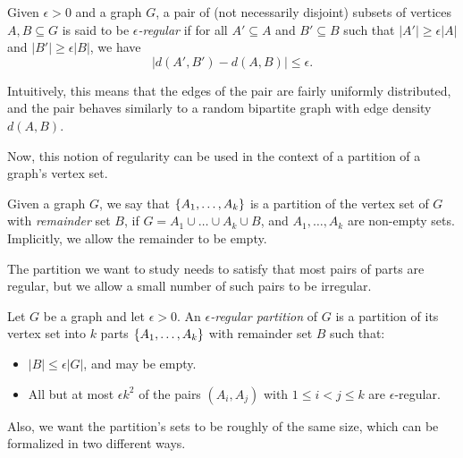         \begin{definition} \label{def:regularity}
            Given $\epsilon > 0$ and a graph $G$, a pair of (not necessarily disjoint) subsets of vertices $A, B \subseteq G$
            is said to be \emph{$\epsilon$-regular} if for all $A' \subseteq A$ and $B' \subseteq B$ such that
            $|A'| \geq \epsilon |A|$ and $|B'| \geq \epsilon |B|$, we have
            \[
                |d(A', B') - d(A, B)| \leq \epsilon.
            \]
        \end{definition}

        Intuitively, this means that the edges of the pair are fairly uniformly distributed, and the pair behaves
        similarly to a random bipartite graph with edge density $d(A, B)$.

        Now, this notion of regularity can be used in the context of a partition of a graph's vertex set.

        \begin{definition}
            Given a graph $G$, we say that $\{ A_1, \ldots, A_k \}$ is a partition of the vertex set of $G$ with
            \emph{remainder} set $B$, if $G = A_1 \cup \dots \cup A_k \cup B$, and $A_1, \dots, A_k$ are non-empty sets.
            Implicitly, we allow the remainder to be empty.
        \end{definition}

        The partition we want to study needs to satisfy that most pairs of parts are regular,
        but we allow a small number of such pairs to be irregular.

        \begin{definition} \label{def:regular_partition}
            Let $G$ be a graph and let $\epsilon > 0$.
            An \emph{$\epsilon$-regular partition} of $G$ is a partition of its vertex set into $k$ parts
            $\{ A_1, \ldots, A_k \}$ with remainder set $B$ such that:
            \begin{itemize}
                \item $|B| \leq \epsilon |G|$, and may be empty.
                \item All but at most $\epsilon k^2$ of the pairs $(A_i, A_j)$ with $1 \leq i < j \leq k$ are
                    $\epsilon$-regular.
            \end{itemize}
        \end{definition}

        Also, we want the partition's sets to be roughly of the same size, which can be formalized in two different ways.

